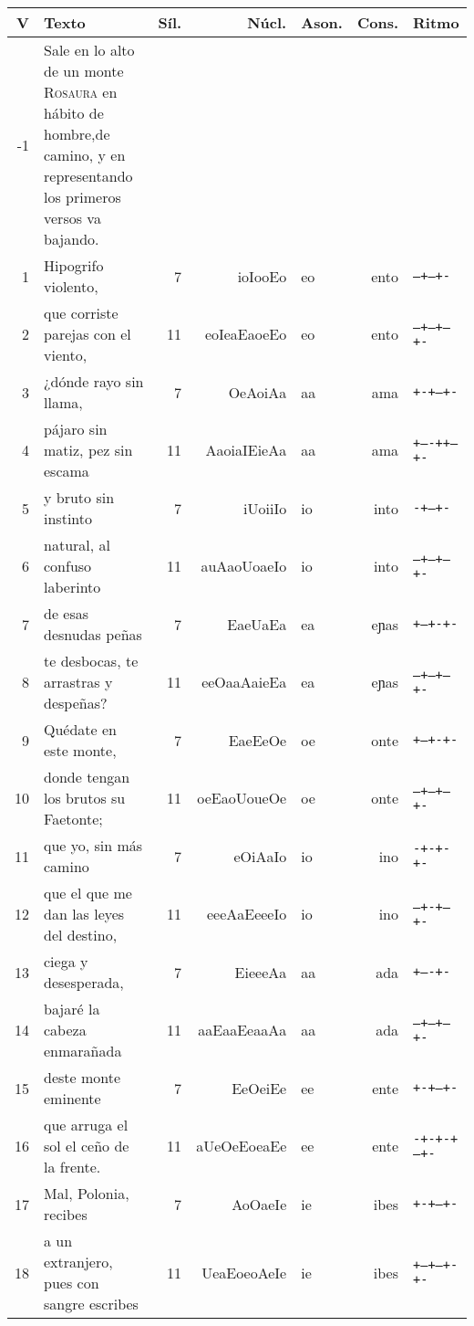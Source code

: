 \begin{table}[!ht]
	\centering\scriptsize
\begin{tabular}{rp{5.6cm}rrlrl}
\toprule
\textbf{V} &\textbf{Texto} &\textbf{Síl.} & \textbf{Núcl.} & \textbf{Ason.} & \textbf{Cons.} & \textbf{Ritmo}\\
\midrule
-1 & Sale en lo alto de un monte \textsc{Rosaura} en hábito de hombre,de camino, y en representando los primeros versos va bajando.&&&&&\\
1 & Hipogrifo violento, & 7 & ioIooEo & eo & ento & \texttt{--+---+-}\\
2 & que corriste parejas con el viento, & 11 &eoIeaEaoeEo & eo &ento & \texttt{--+--+---+-}\\
3 & ¿dónde rayo sin llama, & 7 &OeAoiAa & aa & ama & \texttt{+-+--+-}\\
4 & pájaro sin matiz, pez sin escama & 11 &AaoiaIEieAa & aa & ama & \texttt{+----++--+-}\\
5 &  y bruto sin instinto & 7 &iUoiiIo & io & into & \texttt{-+---+-}\\
6 & natural, al confuso laberinto & 11 &auAaoUoaeIo & io & into & \texttt{--+--+---+-}\\
7 &  de esas desnudas peñas & 7 &EaeUaEa & ea & eɲas & \texttt{+--+-+-}\\
8 & te desbocas, te arrastras y despeñas? & 11 &eeOaaAaieEa & ea & eɲas & \texttt{--+--+---+-}\\
9 & Quédate en este monte, & 7 &EaeEeOe & oe & onte & \texttt{+--+-+-}\\
10 &  donde tengan los brutos su Faetonte; & 11 &oeEaoUoueOe & oe & onte & \texttt{--+--+---+-}\\
11 &  que yo, sin más camino & 7 &eOiAaIo & io & ino & \texttt{-+-+-+-}\\
12 & que el que me dan las leyes del destino, & 11 &eeeAaEeeeIo & io & ino & \texttt{---+-+---+-}\\
13 & ciega y desesperada, & 7 &EieeeAa & aa & ada & \texttt{+----+-}\\
14 & bajaré la cabeza enmarañada & 11 &aaEaaEeaaAa & aa & ada & \texttt{--+--+---+-}\\
15 & deste monte eminente & 7 &EeOeiEe & ee & ente & \texttt{+-+--+-}\\
16 &  que arruga el sol el ceño de la frente. & 11 &aUeOeEoeaEe & ee & ente & \texttt{-+-+-+---+-}\\
17 &  Mal, Polonia, recibes & 7 &AoOaeIe & ie & ibes & \texttt{+-+--+-}\\
18 & a un extranjero, pues con sangre escribes & 11 &UeaEoeoAeIe & ie & ibes & \texttt{+--+---+-+-}\\

\end{tabular}
\end{table}
